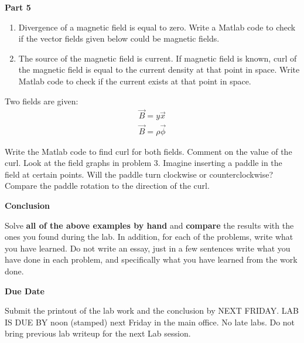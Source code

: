 \documentclass[]{report}
\begin{document}
\begin{description}
\item{\bf{Part 5}} 

\begin{enumerate}
\item Divergence of a magnetic field is equal to zero. Write a Matlab code to check if the vector fields given below could be magnetic fields.
\item The source of the magnetic field is current. If magnetic field is known, curl of the magnetic field is equal to the current density at that point in space. Write Matlab code to check if the current exists at that point in space.   
\end{enumerate}

Two fields are given: 
\begin{eqnarray}
\vec{B}=y \vec{x}   \\
\vec{B}= \rho \vec{\phi}
\end{eqnarray}

Write the Matlab code to find curl for both  fields. Comment on the value of the curl. Look at the field graphs in problem 3. Imagine inserting a paddle in the field at certain points. Will the paddle turn clockwise or counterclockwise? Compare the paddle rotation to the direction of the curl.


\item{\bf{Conclusion}} 

Solve {\bf all of the above examples by hand} and {\bf compare} the results with the ones you found during the lab. In addition, for each of the problems, write what you have learned. Do not write an essay, just in a few sentences write what you have done in each problem, and specifically what you have learned from the work done.


\item{\bf{Due Date}} 

Submit the printout of the lab work and the conclusion by NEXT FRIDAY. LAB IS DUE BY noon (stamped) next Friday in the main office. No late labs. Do not bring previous lab writeup for the next Lab session.

\end{description}
\end{document}

